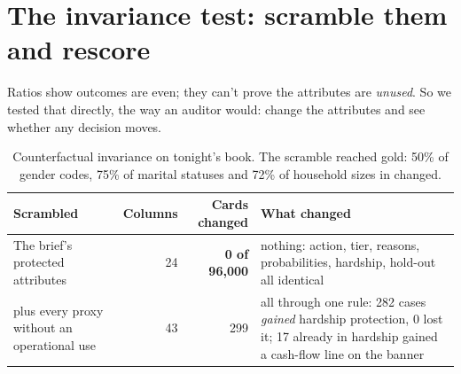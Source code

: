 \documentclass[11pt]{article}
\begin{document}
\section{The invariance test: scramble them and rescore}

Ratios show outcomes are even; they can't prove the attributes are \emph{unused}. So we tested that directly, the way
an auditor would: change the attributes and see whether any decision moves.

\begin{center}
\end{center}

\begin{table}[H]\small\centering
\begin{tabularx}{\linewidth}{@{}>{\raggedright\arraybackslash}p{3.6cm}rrL@{}}
\toprule
\textbf{Scrambled} & \textbf{Columns} & \textbf{Cards changed} & \textbf{What changed} \\
\midrule
The brief's protected attributes & 24 & \textbf{0 of 96,000} & nothing: action, tier, reasons, probabilities, hardship, hold-out all identical \\
\quad plus every proxy without an operational use & 43 & 299 & all through one rule: 282 cases \emph{gained} hardship protection, 0 lost it; 17 already in hardship gained a cash-flow line on the banner \\
\bottomrule
\end{tabularx}
\caption{Counterfactual invariance on tonight's book. The scramble reached gold: 50\% of gender codes, 75\% of marital statuses
and 72\% of household sizes in  changed.}
\end{table}
\end{document}
